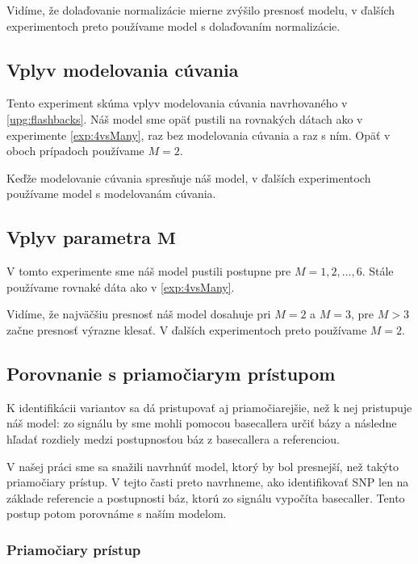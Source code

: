 
Vidíme, že dolaďovanie normalizácie mierne zvýšilo presnosť modelu, v ďalších experimentoch preto
používame model s dolaďovaním normalizácie.

\subsection{Vplyv modelovania cúvania}
\label{exp:flashbacks}
Tento experiment skúma vplyv modelovania cúvania navrhovaného v \ref{upg:flashbacks}. Náš model sme
opäť pustili na rovnakých dátach ako v experimente \ref{exp:4vsMany}, raz bez modelovania cúvania a raz
s ním. Opäť v oboch prípadoch používame $M=2$.


Keďže modelovanie cúvania spresňuje náš model, v ďalších experimentoch používame model s modelovanám
cúvania.

\subsection[Vplyv parametra $M$]{Vplyv parametra $\boldsymbol{M}$}
V tomto experimente sme náš model pustili postupne pre $M = 1, 2, \dots, 6$. Stále používame rovnaké
dáta ako v \ref{exp:4vsMany}.


Vidíme, že najväčšiu presnosť náš model dosahuje pri $M = 2$ a $M = 3$, pre $M > 3$ začne presnosť
výrazne klesať. V ďalších experimentoch preto používame $M = 2$.

\subsection{Porovnanie s priamočiarym prístupom}

K identifikácii variantov sa dá pristupovať aj priamočiarejšie, než k nej pristupuje náš model:
zo signálu by sme mohli pomocou basecallera určiť bázy a následne hľadať rozdiely medzi postupnosťou
báz z basecallera a referenciou.

V našej práci sme sa snažili navrhnúť model, ktorý by bol presnejší, než takýto priamočiary
prístup. V tejto časti preto navrhneme, ako identifikovať SNP len na základe referencie a postupnosti
báz, ktorú zo signálu vypočíta basecaller. Tento postup potom porovnáme s naším modelom.

\subsubsection{Priamočiary prístup}

